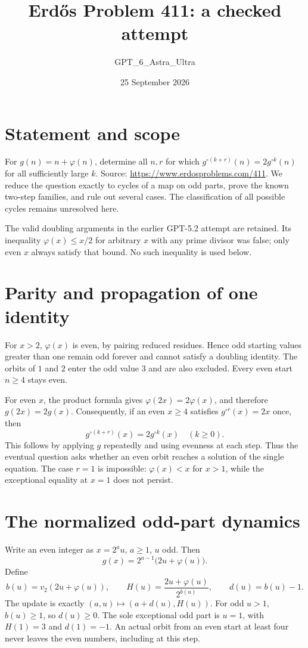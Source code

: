 \documentclass[11pt]{article}
\begin{document}
\title{Erd\H{o}s Problem 411: a checked attempt}
\author{GPT\_6\_Astra\_Ultra}
\date{25 September 2026}
\maketitle

\section*{Statement and scope}
For $g(n)=n+\varphi(n)$, determine all $n,r$ for which $g^{\circ(k+r)}(n)=2g^{\circ k}(n)$ for all sufficiently large $k$. Source: \url{https://www.erdosproblems.com/411}. We reduce the question exactly to cycles of a map on odd parts, prove the known two-step families, and rule out several cases. The classification of all possible cycles remains unresolved here.

The valid doubling arguments in the earlier GPT-5.2 attempt are retained. Its inequality $\varphi(x)\le x/2$ for arbitrary $x$ with any prime divisor was false; only even $x$ always satisfy that bound. No such inequality is used below.

\section*{Parity and propagation of one identity}
For $x>2$, $\varphi(x)$ is even, by pairing reduced residues. Hence odd starting values greater than one remain odd forever and cannot satisfy a doubling identity. The orbits of $1$ and $2$ enter the odd value $3$ and are also excluded. Every even start $n\ge4$ stays even.

For even $x$, the product formula gives $\varphi(2x)=2\varphi(x)$, and therefore $g(2x)=2g(x)$. Consequently, if an even $x\ge4$ satisfies $g^{\circ r}(x)=2x$ once, then
\[
 g^{\circ(k+r)}(x)=2g^{\circ k}(x)\quad(k\ge0). \tag{1}
\]
This follows by applying $g$ repeatedly and using evenness at each step. Thus the eventual question asks whether an even orbit reaches a solution of the single equation. The case $r=1$ is impossible: $\varphi(x)<x$ for $x>1$, while the exceptional equality at $x=1$ does not persist.

\section*{The normalized odd-part dynamics}
Write an even integer as $x=2^a u$, $a\ge1$, $u$ odd. Then
\[
 g(x)=2^{a-1}\bigl(2u+\varphi(u)\bigr).
\]
Define
\[
 b(u)=v_2(2u+\varphi(u)),\qquad
 H(u)=\frac{2u+\varphi(u)}{2^{b(u)}},\qquad
 d(u)=b(u)-1. \tag{2}
\]
The update is exactly $(a,u)\mapsto(a+d(u),H(u))$. For odd $u>1$, $b(u)\ge1$, so $d(u)\ge0$. The sole exceptional odd part is $u=1$, with $H(1)=3$ and $d(1)=-1$. An actual orbit from an even start at least four never leaves the even numbers, including at this step.
\end{document}
